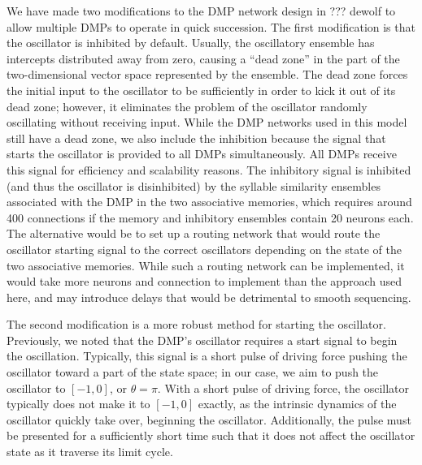 We have made two modifications
to the DMP network design
in ??? dewolf
to allow multiple DMPs
to operate in quick succession.
The first modification
is that the oscillator is inhibited
by default.
Usually, the oscillatory ensemble
has intercepts distributed away from zero,
causing a ``dead zone'' in the part of the
two-dimensional vector space represented
by the ensemble.
The dead zone forces the initial input
to the oscillator
to be sufficiently
in order to kick it out of its dead zone;
however, it eliminates the problem
of the oscillator randomly
oscillating without receiving input.
While the DMP networks used in this model
still have a dead zone,
we also include the inhibition
because the signal that
starts the oscillator is provided
to all DMPs simultaneously.
All DMPs receive this signal
for efficiency and scalability reasons.
The inhibitory signal is inhibited
(and thus the oscillator is disinhibited)
by the syllable similarity ensembles
associated with the DMP
in the two associative memories,
which requires around 400 connections
if the memory and inhibitory ensembles
contain 20 neurons each.
The alternative would be to
set up a routing network
that would route the oscillator starting signal
to the correct oscillators depending on
the state of the two associative memories.
While such a routing network can be implemented,
it would take more neurons and connection
to implement than the approach used here,
and may introduce delays that
would be detrimental to smooth sequencing.

The second modification is a more robust
method for starting the oscillator.
Previously, we noted that the DMP's oscillator
requires a start signal to begin
the oscillation.
Typically, this signal is a short pulse
of driving force pushing the oscillator
toward a part of the state space;
in our case, we aim to push the oscillator
to $[-1, 0]$, or $\theta=\pi$.
With a short pulse of driving force,
the oscillator typically does not
make it to $[-1, 0]$ exactly,
as the intrinsic dynamics of the oscillator
quickly take over,
beginning the oscillator.
Additionally, the pulse
must be presented for a sufficiently short time
such that it does not affect
the oscillator state as it traverse
its limit cycle.


